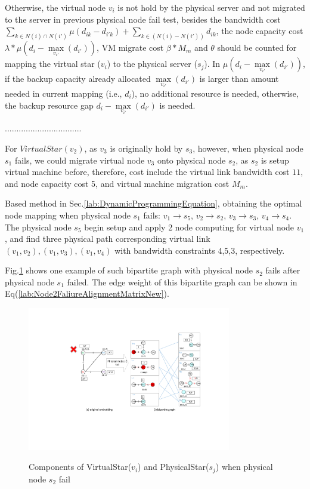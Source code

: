 Otherwise, the virtual node $v_i$ is not hold by the physical server and not migrated to the server in previous physical node fail test, besides the bandwidth cost ${\sum\limits_{k \in N(i) \cap N(i')} {\mu({d_{ik}} - {d_{i'k}})}  + \sum\limits_{k \in \left( {N(i) - N(i')} \right)} {{d_{ik}}} }$, the node capacity cost ${\lambda * \mu({d_i} - \mathop {\max }\limits_{{v_{i'}}} \left( {{d_{i'}}} \right))}$, VM migrate cost ${\beta * {M_m}}$ and $\theta$ should be counted for mapping the virtual star ($v_i$) to the physical server ($s_j$). In ${\mu({d_i} - \mathop {\max }\limits_{{v_{i'}}} \left( {{d_{i'}}} \right))}$, if the backup capacity already allocated ${\mathop {\max }\limits_{{v_{i'}}} \left( {{d_{i'}}} \right)}$ is larger than amount needed  in current mapping (i.e., $d_i$), no additional resource is needed, otherwise, the backup resource gap ${{d_i} - \mathop {\max }\limits_{{v_{i'}}} \left( {{d_{i'}}} \right)}$ is needed.

.................................


For $VirtualStar(v_2)$, as $v_3$ is originally hold by $s_3$, however, when physical node $s_1$ fails, we could migrate virtual node $v_3$ onto physical node $s_2$, as $s_2$ is setup virtual machine before, therefore, cost include the virtual link bandwidth cost $11$, and node capacity cost 5, and virtual machine migration cost $M_m$.

Based method in Sec.\ref{lab:DynamicProgrammingEquation}, obtaining the optimal node mapping when physical node $s_1$ fails: $v_1 \rightarrow s_5$, $v_2 \rightarrow s_2$, $v_3 \rightarrow s_3$, $v_4 \rightarrow s_4$. The physical node $s_5$ begin setup and apply 2 node computing for virtual node $v_1$, and find three physical path corresponding virtual link $(v_1,v_2),(v_1,v_3),(v_1,v_4)$ with bandwidth constraints 4,5,3, respectively.

Fig.\ref{fig:StarRepresentationNode2} shows one example of such  bipartite graph with physical node $s_2$ fails after physical node $s_1$ failed. The edge weight of this   bipartite graph can be shown in  Eq(\ref{lab:Node2FaliureAlignmentMatrixNew}).


\begin{figure}
\centering
\includegraphics[width=3.5in]{Fig/StarRepresentationNode2}\\
  \caption{Components of VirtualStar($v_i$) and PhysicalStar($s_j$) when physical node $s_2$ fail}\label{fig:StarRepresentationNode2}
\end{figure}


